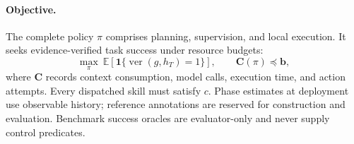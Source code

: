 \paragraph{Objective.}
The complete policy $\pi$ comprises planning, supervision, and local execution. It seeks evidence-verified task success under resource budgets:
\begin{equation}
\max_{\pi}\ \mathbb E\!\left[\mathbf 1\{\operatorname{ver}(g,h_T)=1\}\right],
\qquad \mathbf C(\pi)\preceq\mathbf b,
\label{eq:objective}
\end{equation}
where $\mathbf C$ records context consumption, model calls, execution time, and action attempts. Every dispatched skill must satisfy $c$. Phase estimates at deployment use observable history; reference annotations are reserved for construction and evaluation. Benchmark success oracles are evaluator-only and never supply control predicates.

